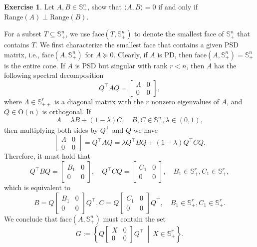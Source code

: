 \documentclass[
]{book}
\theoremstyle{definition}
\theoremstyle{definition}
\theoremstyle{definition}
\newtheorem{exercise}{Exercise}[chapter]
\theoremstyle{definition}
\theoremstyle{remark}
\begin{document}
\begin{exercise}
Let \(A,B \in \mathbb{S}^{n}_{+}\), show that \(\langle A, B \rangle = 0\) if and only if \(\mathrm{Range}(A) \perp \mathrm{Range}(B)\).
\end{exercise}

For a subset \(T \subseteq \mathbb{S}^{n}_{+}\), we use \(\mathrm{face}(T,\mathbb{S}^{n}_{+})\) to denote the smallest face of \(\mathbb{S}^{n}_{+}\) that contains \(T\). We first characterize the smallest face that contains a given PSD matrix, i.e., \(\mathrm{face}(A,\mathbb{S}^{n}_{+})\) for \(A\succeq 0\). Clearly, if \(A\) is PD, then \(\mathrm{face}(A, \mathbb{S}^{n}_{+}) = \mathbb{S}^{n}_{+}\) is the entire cone. If \(A\) is PSD but singular with rank \(r < n\), then \(A\) has the following spectral decomposition
\[
Q^\top A Q = \begin{bmatrix} \Lambda & 0 \\ 0 & 0 \end{bmatrix},
\]
where \(\Lambda \in \mathbb{S}^{r}_{++}\) is a diagonal matrix with the \(r\) nonzero eigenvalues of \(A\), and \(Q \in \mathrm{O}(n)\) is orthogonal. If
\[
A = \lambda B + (1-\lambda)C, \quad B,C \in \mathbb{S}^{n}_{+},\lambda \in (0,1),
\]
then multiplying both sides by \(Q^\top\) and \(Q\) we have
\[
\begin{bmatrix} \Lambda & 0 \\ 0 & 0 \end{bmatrix} = Q^\top A Q = \lambda Q^\top B Q + (1-\lambda) Q^\top C Q.
\]
Therefore, it must hold that
\[
Q^\top B Q = \begin{bmatrix} B_1 & 0 \\ 0 & 0 \end{bmatrix}, \quad Q^\top C Q = \begin{bmatrix} C_1 & 0 \\ 0 & 0 \end{bmatrix}, \quad B_1 \in \mathbb{S}^{r}_{+}, C_1 \in \mathbb{S}^{r}_{+},
\]
which is equivalent to
\[
B = Q \begin{bmatrix} B_1 & 0 \\ 0 & 0 \end{bmatrix} Q^\top, C = Q \begin{bmatrix} C_1 & 0 \\ 0 & 0 \end{bmatrix} Q^\top, \quad B_1 \in \mathbb{S}^{r}_{+}, C_1 \in \mathbb{S}^{r}_{+}.
\]
We conclude that \(\mathrm{face}(A,\mathbb{S}^{n}_{+})\) must contain the set
\begin{equation}
G:=  \left\{ Q \begin{bmatrix} X & 0 \\ 0 & 0 \end{bmatrix} Q^\top\ \middle\vert\ X \in \mathbb{S}^{r}_{+} \right\} .
\label{eq:face-of-A-psd}
\end{equation}
\end{document}
